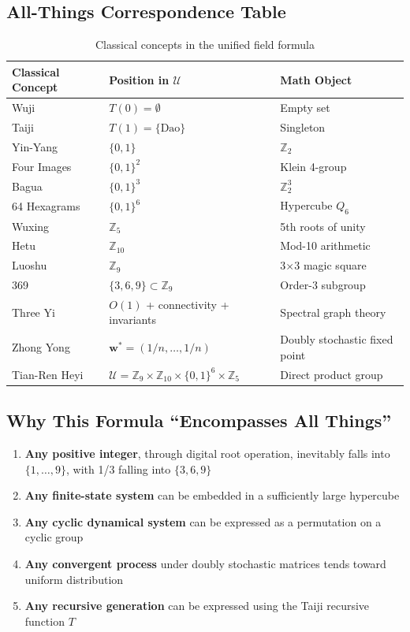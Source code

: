 \documentclass[conference]{IEEEtran}
\theoremstyle{remark}
\newcommand{\Z}{\mathbb{Z}}
\newcommand{\U}{\mathcal{U}}
\begin{document}
\subsection{All-Things Correspondence Table}

\begin{table}[h]
\centering
\caption{Classical concepts in the unified field formula}
\label{tab:unified}
\begin{tabular}{p{2.2cm}p{3.5cm}p{2.2cm}}
\toprule
Classical Concept & Position in $\U$ & Math Object \\
\midrule
Wuji & $T(0)=\emptyset$ & Empty set \\
Taiji & $T(1)=\{\text{Dao}\}$ & Singleton \\
Yin-Yang & $\{0,1\}$ & $\Z_2$ \\
Four Images & $\{0,1\}^2$ & Klein 4-group \\
Bagua & $\{0,1\}^3$ & $\Z_2^3$ \\
64 Hexagrams & $\{0,1\}^6$ & Hypercube $Q_6$ \\
Wuxing & $\Z_5$ & 5th roots of unity \\
Hetu & $\Z_{10}$ & Mod-10 arithmetic \\
Luoshu & $\Z_9$ & 3$\times$3 magic square \\
369 & $\{3,6,9\}\subset\Z_9$ & Order-3 subgroup \\
Three Yi & $O(1)$ + connectivity + invariants & Spectral graph theory \\
Zhong Yong & $\mathbf{w}^*=(1/n,\ldots,1/n)$ & Doubly stochastic fixed point \\
Tian-Ren Heyi & $\U=\Z_9\times\Z_{10}\times\{0,1\}^6\times\Z_5$ & Direct product group \\
\bottomrule
\end{tabular}
\end{table}

\subsection{Why This Formula ``Encompasses All Things''}

\begin{enumerate}[nosep]
\item \textbf{Any positive integer}, through digital root operation, inevitably falls into $\{1,\ldots,9\}$, with 1/3 falling into $\{3,6,9\}$
\item \textbf{Any finite-state system} can be embedded in a sufficiently large hypercube
\item \textbf{Any cyclic dynamical system} can be expressed as a permutation on a cyclic group
\item \textbf{Any convergent process} under doubly stochastic matrices tends toward uniform distribution
\item \textbf{Any recursive generation} can be expressed using the Taiji recursive function $T$
\end{enumerate}
\end{document}
